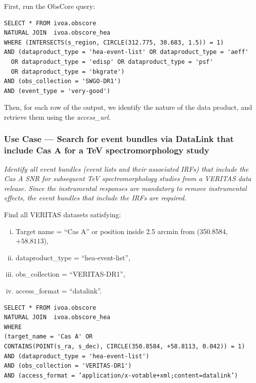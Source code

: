 First, run the ObsCore query:
\begin{verbatim}
SELECT * FROM ivoa.obscore
NATURAL JOIN  ivoa.obscore_hea
WHERE (INTERSECTS(s_region, CIRCLE(312.775, 30.683, 1.5)) = 1)
AND (dataproduct_type = 'hea-event-list' OR dataproduct_type = 'aeff'
  OR dataproduct_type = 'edisp' OR dataproduct_type = 'psf'
  OR dataproduct_type = 'bkgrate')
AND (obs_collection = 'SWGO-DR1')
AND (event_type = 'very-good')
\end{verbatim}

Then, for each row of the output, we identify the nature of the data product, and retrieve them using the {\em access\_url\/}.

\subsubsection{Use Case --- Search for event bundles via DataLink that include Cas A for a TeV spectromorphology study}

{\em Identify all event bundles (event lists and their associated \glspl{IRF}) that include the Cas A SNR for subsequent TeV spectromorphology studies from a VERITAS data release. Since the instrumental responses are mandatory to remove instrumental effects, the event bundles that include the  \glspl{IRF} are required.\/}


\medskip
\noindent Find all VERITAS datasets satisfying:
\begin{enumerate}[(i)]
  \item Target name = ``Cas A'' or position inside 2.5 arcmin from (350.8584, $+58.8113$),
  \item dataproduct\_type = ``hea-event-list'',
  \item obs\_collection = ``VERITAS-DR1'',
  \item access\_format = ``datalink''.
\end{enumerate}

\begin{verbatim}
SELECT * FROM ivoa.obscore
NATURAL JOIN  ivoa.obscore_hea
WHERE
(target_name = 'Cas A' OR
CONTAINS(POINT(s_ra, s_dec), CIRCLE(350.8584, +58.8113, 0.042)) = 1)
AND (dataproduct_type = 'hea-event-list')
AND (obs_collection = 'VERITAS-DR1')
AND (access_format = ’application/x-votable+xml;content=datalink’)
\end{verbatim}

